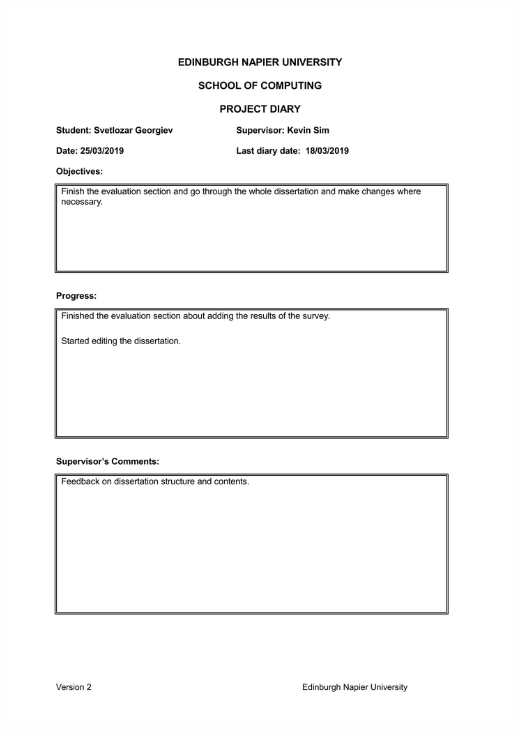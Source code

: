 \documentclass[12pt,a4paper]{article}
\begin{document}
\begin{appendices}
\includegraphics[width=\textwidth,height=\textheight,keepaspectratio]{s2week9.jpg}


\newpage

\end{appendices}
\end{document}
